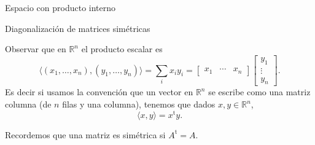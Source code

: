 \documentclass[a4paper,12pt,twoside,spanish,reqno]{amsbook}
\newtheorem{proposicion}[teorema]{Proposici\'on}
\theoremstyle{definition}
\newtheorem{definicion}{Definici\'on}[section]
\theoremstyle{remark}
\newcommand{\la}{\langle}
\newcommand{\ra}{\rangle}
\renewcommand{\t}{{\operatorname{t}}}
\newcommand{\R}{\mathbb R}
\begin{document}
\begin{chapter}{Espacio con producto interno}



\begin{section}{Diagonalización de matrices simétricas}
    

    
    
    Observar que en $\R^n$ el producto escalar es 
    \begin{equation*}
        \la (x_1,\ldots,x_n),(y_1,\ldots,y_n)  \ra = \sum_i x_iy_i = \begin{bmatrix} x_1& \cdots &x_n\end{bmatrix}\begin{bmatrix} y_1 \\ \vdots \\ y_n \end{bmatrix}.
    \end{equation*}
    Es decir si usamos la convención que un vector en $\R^n$  se escribe como una matriz columna (de $n$ filas y una columna),  tenemos que dados $x,y \in \R^n$, 
    \begin{equation*}
        \la x,y \ra = x^\t y.
    \end{equation*}
    
    Recordemos que una matriz es simétrica si $A^\t =A$. 
    

\end{section}
\end{chapter}
\end{document}
